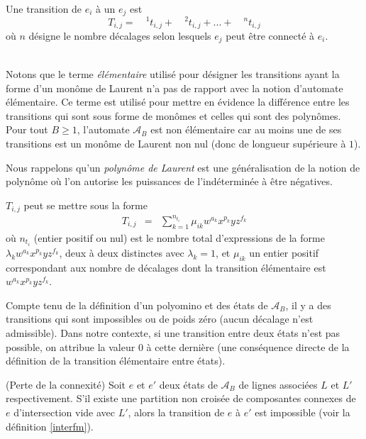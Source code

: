 \begin{Def}\label{defAt13}
Une transition de $e_{i}$ à un  $e_{j}$ est  $$T_{i,j}=\quad ^{1}t_{i,j}+\quad ^{2}t_{i,j}+ ...+\quad  ^{n}t_{i,j}$$ où $n$ désigne le nombre décalages selon lesquels $e_{j}$ peut être connecté  à $e_{i}$. 
\end{Def}
\begin{Rem}\label{remtrans1}\mbox{  }\\
 Notons que le terme \emph{élémentaire} utilisé pour désigner les transitions  ayant la forme d'un monôme de Laurent n'a pas de rapport avec la notion d'automate élémentaire. Ce terme est utilisé pour mettre  en évidence la différence entre les transitions qui sont sous forme de monômes et celles qui sont des polynômes. Pour tout $B\geq 1$, l'automate $\mathcal{A}_{B}$ est non élémentaire car au moins une de ses transitions est un monôme de Laurent non nul (donc de longueur supérieure à $1$).

  Nous rappelons qu’un \emph{polynôme de Laurent} est une généralisation de la notion de polynôme où l'on autorise les puissances de l'indéterminée à être négatives.
  
 $T_{i,j}$  peut se mettre sous la forme 
 \begin{eqnarray}\label{eq}
 T_{i,j}& = & \sum_{k=1}^{n_{t_{i}}}\mu_{ik} w^{a_{k}}x^{p_{k}}yz^{f_{k}}
 \end{eqnarray}  
   où $n_{t_{i}}$ (entier positif ou nul) est le nombre total d'expressions  de la forme $\lambda_{k} w^{a_{k}}x^{p_{k}}yz^{f_{k}}$, deux à deux distinctes avec $\lambda_{k}=1$, et $\mu_{ik}$ un entier positif  correspondant aux nombre de décalages dont la transition élémentaire est $ w^{a_{k}}x^{p_{k}}yz^{f_{k}}$.
  
  
Compte tenu de la définition d'un polyomino et des états de $\mathcal{A}_{B}$, il y a des transitions qui sont impossibles ou de poids zéro (aucun décalage n'est admissible). Dans notre contexte, si une transition entre deux états n'est pas possible, on attribue la valeur $0$ à cette dernière (une conséquence directe de la définition de la transition élémentaire entre états).  
\end{Rem}
\begin{Prop}(Perte de la connexité)\label{prop1}
Soit $e$ et $e'$ deux états de $\mathcal{A}_{B}$ de lignes associées $L$ et $L'$ respectivement. S'il existe une partition non croisée de composantes connexes   de $e$ d'intersection vide avec $L'$, alors  la transition de $e$ à $e'$ est impossible (voir la définition \ref{interfm}).
\end{Prop}
